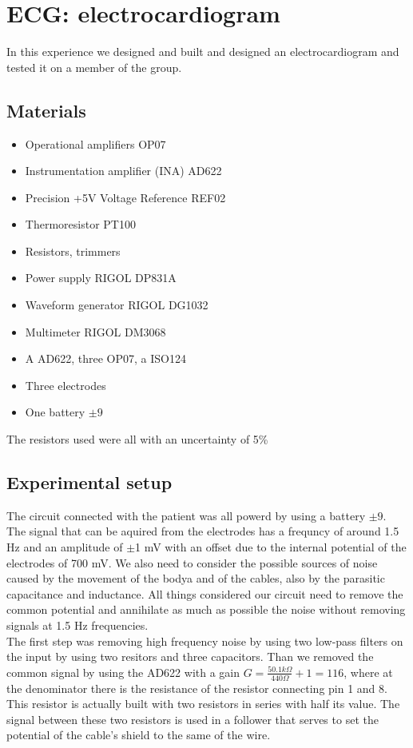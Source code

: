 \chapter{ECG: electrocardiogram}
In this experience we designed and built and designed an electrocardiogram and tested it on a member of the group.

\section{Materials}
\begin{itemize}
\item Operational amplifiers OP07
\item Instrumentation amplifier (INA) AD622
\item Precision +5V Voltage Reference REF02
\item Thermoresistor PT100
\item Resistors, trimmers
\item Power supply RIGOL DP831A
\item Waveform generator RIGOL DG1032
\item Multimeter RIGOL DM3068
\item A AD622, three OP07, a ISO124
\item Three electrodes
\item One battery $\pm 9$
\end{itemize}
The resistors used were all with an uncertainty of 5\%
\section{Experimental setup}
The circuit connected with the patient was all powerd by using a battery $\pm 9$.
The signal that can be aquired from the electrodes has a frequncy of around 1.5 Hz and an amplitude of $\pm$1 mV with an offset due to the internal potential of the electrodes of 700 mV. We also need to consider the possible sources of noise caused by the movement of the bodya and of the cables, also by the parasitic capacitance and inductance. All things considered our circuit need to remove the common potential and    annihilate as much as possible the noise without removing signals at 1.5 Hz frequencies. \\

The  first step was removing high frequency noise by using two low-pass filters on the input by using two resitors and three capacitors.
Than we removed the common signal by using the AD622 with a gain $G =   \frac{50.1 k\Omega}{440 \Omega} + 1 = 116$, where at the denominator there is the resistance of the resistor connecting pin 1 and 8. This resistor is actually built with two resistors in series with half its value. The signal between these two resistors is used in a follower that serves to set the potential of the cable's shield to the same of the wire.\\

